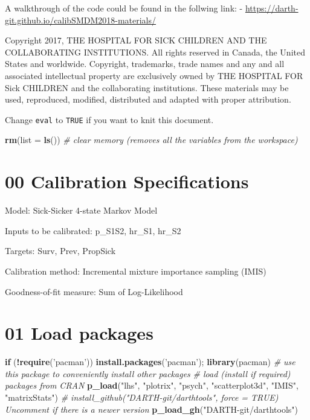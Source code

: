 \documentclass[
]{article}
\newenvironment{Shaded}{\begin{snugshade}}{\end{snugshade}}
\newcommand{\CommentTok}[1]{\textcolor[rgb]{0.56,0.35,0.01}{\textit{#1}}}
\newcommand{\ControlFlowTok}[1]{\textcolor[rgb]{0.13,0.29,0.53}{\textbf{#1}}}
\newcommand{\DataTypeTok}[1]{\textcolor[rgb]{0.13,0.29,0.53}{#1}}
\newcommand{\KeywordTok}[1]{\textcolor[rgb]{0.13,0.29,0.53}{\textbf{#1}}}
\newcommand{\NormalTok}[1]{#1}
\newcommand{\OperatorTok}[1]{\textcolor[rgb]{0.81,0.36,0.00}{\textbf{#1}}}
\newcommand{\StringTok}[1]{\textcolor[rgb]{0.31,0.60,0.02}{#1}}
\begin{document}
A walkthrough of the code could be found in the follwing link: -
\url{https://darth-git.github.io/calibSMDM2018-materials/}

Copyright 2017, THE HOSPITAL FOR SICK CHILDREN AND THE COLLABORATING
INSTITUTIONS. All rights reserved in Canada, the United States and
worldwide. Copyright, trademarks, trade names and any and all associated
intellectual property are exclusively owned by THE HOSPITAL FOR Sick
CHILDREN and the collaborating institutions. These materials may be
used, reproduced, modified, distributed and adapted with proper
attribution.

\newpage

Change \texttt{eval} to \texttt{TRUE} if you want to knit this document.

\begin{Shaded}
\begin{Highlighting}[]
\KeywordTok{rm}\NormalTok{(}\DataTypeTok{list =} \KeywordTok{ls}\NormalTok{())      }\CommentTok{# clear memory (removes all the variables from the workspace)}
\end{Highlighting}
\end{Shaded}

\hypertarget{calibration-specifications}{%
\section{00 Calibration
Specifications}\label{calibration-specifications}}

Model: Sick-Sicker 4-state Markov Model

Inputs to be calibrated: p\_S1S2, hr\_S1, hr\_S2

Targets: Surv, Prev, PropSick

Calibration method: Incremental mixture importance sampling (IMIS)

Goodness-of-fit measure: Sum of Log-Likelihood

\hypertarget{load-packages}{%
\section{01 Load packages}\label{load-packages}}

\begin{Shaded}
\begin{Highlighting}[]
\ControlFlowTok{if}\NormalTok{ (}\OperatorTok{!}\KeywordTok{require}\NormalTok{(}\StringTok{'pacman'}\NormalTok{)) }\KeywordTok{install.packages}\NormalTok{(}\StringTok{'pacman'}\NormalTok{); }\KeywordTok{library}\NormalTok{(pacman) }\CommentTok{# use this package to conveniently install other packages}
\CommentTok{# load (install if required) packages from CRAN}
\KeywordTok{p_load}\NormalTok{(}\StringTok{"lhs"}\NormalTok{, }\StringTok{"plotrix"}\NormalTok{, }\StringTok{"psych"}\NormalTok{, }\StringTok{"scatterplot3d"}\NormalTok{, }\StringTok{"IMIS"}\NormalTok{, }\StringTok{"matrixStats"}\NormalTok{)}
\CommentTok{# install_github("DARTH-git/darthtools", force = TRUE) Uncomment if there is a newer version}
\KeywordTok{p_load_gh}\NormalTok{(}\StringTok{"DARTH-git/darthtools"}\NormalTok{)}
\end{Highlighting}
\end{Shaded}
\end{document}
